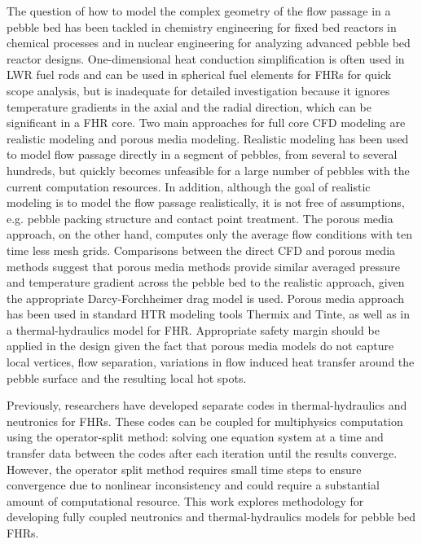 \documentclass{elsarticle}
\begin{document}
The question of how to model the complex geometry of the flow passage in a pebble bed has been tackled in chemistry engineering\cite{Dixon2001}\cite{Miroliaei2011} for fixed bed reactors in chemical processes and in nuclear engineering for analyzing advanced pebble bed reactor designs.  One-dimensional heat conduction simplification is often used in LWR fuel rods and can be used in spherical fuel elements for FHRs for quick scope analysis, but is inadequate for detailed investigation because it ignores temperature gradients in the axial and the radial direction, which can be significant in a FHR core. Two main approaches for full core CFD modeling are realistic modeling and porous media modeling. Realistic modeling has been used to model flow passage directly in a segment of pebbles, from several to several hundreds\cite{Lee2007}\cite{Hassana}\cite{Shams2013}, but quickly becomes unfeasible for a large number of pebbles with the current computation resources. In addition, although the goal of realistic modeling is to model the flow passage realistically, it is not free of assumptions\cite{Lee2007}, e.g. pebble packing structure and contact point treatment. The porous media approach, on the other hand, computes only the average flow conditions with ten time less mesh grids. Comparisons between the direct CFD and porous media methods\cite{Wu2010} suggest that porous media methods provide similar averaged pressure and temperature gradient across the pebble bed to the realistic approach, given the appropriate Darcy-Forchheimer drag model is used. Porous media approach has been used in standard HTR modeling tools Thermix\cite{Struth1985} and Tinte\cite{Gerwin1987}, as well as in a thermal-hydraulics model for FHR\cite{Scarlat2012}.
Appropriate safety margin should be applied in the design given the fact that porous media models do not capture local vertices, flow separation, variations in flow induced heat transfer around the pebble surface and the resulting local hot spots.

Previously, researchers have developed separate codes in thermal-hydraulics\cite{Scarlat2012} and neutronics\cite{Cisneros2013} for FHRs. These codes can be coupled for multiphysics computation using the operator-split method: solving one equation system at a time and transfer data between the codes after each iteration until the results converge. However, the operator split method requires small time steps to ensure convergence due to nonlinear inconsistency\cite{Ragusa2009} and could require a substantial amount of computational resource. This work explores methodology for developing fully coupled neutronics and thermal-hydraulics models for pebble bed FHRs.  
\end{document}
